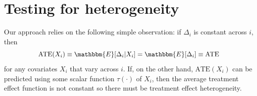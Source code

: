 \cleardoublepage







\section{Testing for heterogeneity}
\label{append:chernozhukov}
Our approach relies on the following simple observation: if $\Delta_i$ is constant across $i$, then 
\[
\text{ATE}(X_i) \equiv \mathbbm{E}[\Delta_i |X_i] = \mathbbm{E}[\Delta_i] \equiv \text{ATE}
\]
for any covariates $X_i$ that vary across $i$. If, on the other hand, $\text{ATE}(X_i)$ can be predicted using some scalar function $\tau(\cdot)$ of $X_i$, then the average treatment effect function is not constant so there must be treatment effect heterogeneity. 

